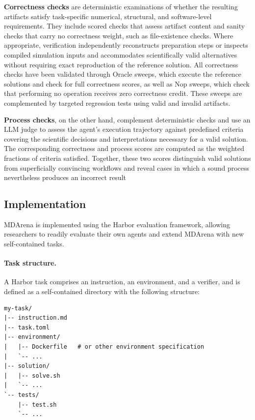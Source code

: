 \textbf{Correctness checks} are deterministic examinations of whether the resulting artifacts satisfy task-specific numerical, structural, and software-level requirements. They include scored checks that assess artifact content and sanity checks that carry no correctness weight, such as file-existence checks. Where appropriate, verification independently reconstructs preparation steps or inspects compiled simulation inputs and accommodates scientifically valid alternatives without requiring exact reproduction of the reference solution. All correctness checks have been validated through Oracle sweeps, which execute the reference solutions and check for full correctness scores, as well as Nop sweeps, which check that performing no operation receives zero correctness credit. These sweeps are complemented by targeted regression tests using valid and invalid artifacts. 

\textbf{Process checks}, on the other hand, complement deterministic checks and use an LLM judge to assess the agent’s execution trajectory against predefined criteria covering the scientific decisions and interpretations necessary for a valid solution. The corresponding correctness and process scores are computed as the weighted fractions of criteria satisfied. Together, these two scores distinguish valid solutions from superficially convincing workflows and reveal cases in which a sound process nevertheless produces an incorrect result

\subsection{Implementation}


MDArena is implemented using the Harbor\cite{Harbor_Framework} evaluation framework, allowing researchers to readily evaluate their own agents and extend MDArena with new self-contained tasks.

\paragraph{Task structure.}
A Harbor task comprises an instruction, an environment, and a verifier, and is defined as a self-contained directory with the following structure:

\begin{verbatim}
my-task/
|-- instruction.md
|-- task.toml
|-- environment/
|   |-- Dockerfile   # or other environment specification
|   `-- ...
|-- solution/
|   |-- solve.sh
|   `-- ...
`-- tests/
    |-- test.sh
    `-- ...
\end{verbatim}

